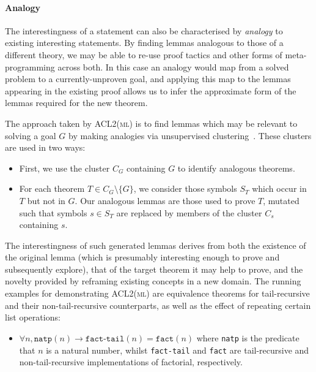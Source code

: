 {\paragraph{Analogy}

The interestingness of a statement can also be characterised by \emph{analogy}
to existing interesting statements. By finding lemmas analogous to those of a
different theory, we may be able to re-use proof tactics and other forms of
meta-programming across both. In this case an analogy would map from a solved
problem to a currently-unproven goal, and applying this map to the lemmas
appearing in the existing proof allows us to infer the approximate form of the
lemmas required for the new theorem.

The approach taken by \textsc{ACL2(ml)} is to find lemmas which may be relevant
to solving a goal $G$ by making analogies via unsupervised
clustering~\cite{Heras.Komendantskaya.Johansson.ea:2013}. These clusters are
used in two ways:

\begin{itemize}
\item First, we use the cluster $C_G$ containing $G$ to identify analogous
  theorems.

\item For each theorem $T \in C_G \setminus \{G\}$, we consider those symbols
  $S_T$ which occur in $T$ but not in $G$. Our analogous lemmas are those used
  to prove $T$, mutated such that symbols $s \in S_T$ are replaced by members of
  the cluster $C_s$ containing $s$.
\end{itemize}

The interestingness of such generated lemmas derives from both the existence of
the original lemma (which is presumably interesting enough to prove and
subsequently explore), that of the target theorem it may help to prove, and the
novelty provided by reframing existing concepts in a new domain. The running
examples for demonstrating \textsc{ACL2(ml)} are equivalence theorems for
tail-recursive and their non-tail-recursive counterparts, as well as the effect
of repeating certain list operations:

\begin{itemize}

  \item $\forall n, \texttt{natp}(n) \rightarrow \texttt{fact-tail}(n) = \texttt{fact}(n)$ where \texttt{natp} is the predicate that $n$ is a natural number, whilst \texttt{fact-tail} and \texttt{fact} are tail-recursive and non-tail-recursive implementations of factorial, respectively.


\end{itemize}}
